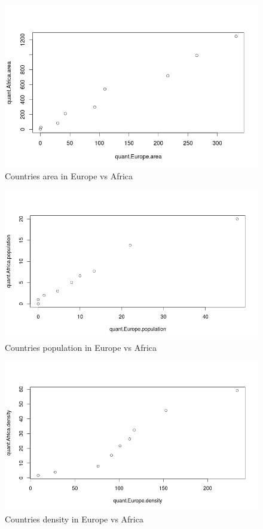 \documentclass{article}
\begin{document}
	\begin{figure}[H]
		\begin{center}
			\includegraphics[scale=0.7]{qqplotarea.png}
		\end{center}
		\caption{Countries area in Europe vs Africa}
	\end{figure}
	
	\begin{figure}[H]
		\begin{center}
			\includegraphics[scale=0.6]{qqplotpopulation.png}
		\end{center}
		\caption{Countries population in Europe vs Africa}
	\end{figure}
	
	\begin{figure}[H]
		\begin{center}
			\includegraphics[scale=0.6]{qqplotdensity.png}
		\end{center}
		\caption{Countries density in Europe vs Africa}
	\end{figure}
\end{document}
